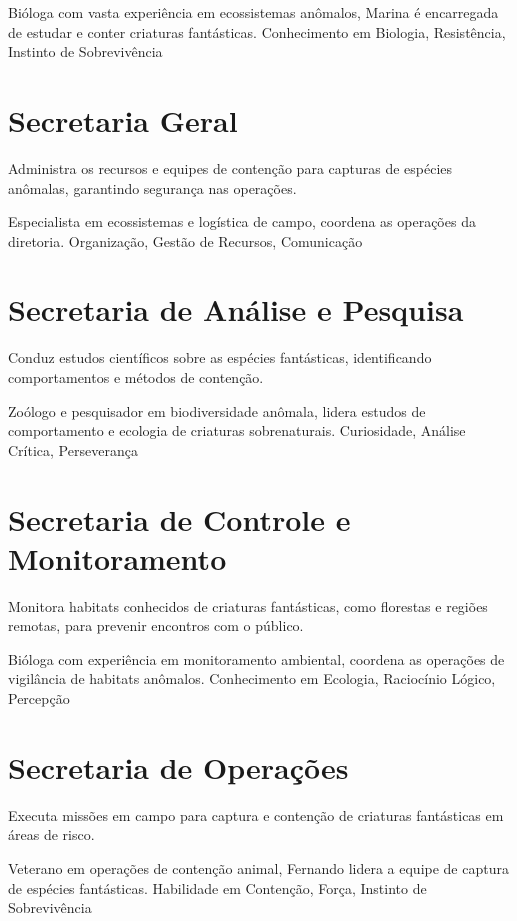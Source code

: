 {Bióloga com vasta experiência em ecossistemas anômalos, Marina é encarregada de estudar e conter criaturas fantásticas.}
{Conhecimento em Biologia, Resistência, Instinto de Sobrevivência}

\section{Secretaria Geral}
Administra os recursos e equipes de contenção para capturas de espécies anômalas, garantindo segurança nas operações.

{Especialista em ecossistemas e logística de campo, coordena as operações da diretoria.}
{Organização, Gestão de Recursos, Comunicação}

\section{Secretaria de Análise e Pesquisa}
Conduz estudos científicos sobre as espécies fantásticas, identificando comportamentos e métodos de contenção.

{Zoólogo e pesquisador em biodiversidade anômala, lidera estudos de comportamento e ecologia de criaturas sobrenaturais.}
{Curiosidade, Análise Crítica, Perseverança}

\section{Secretaria de Controle e Monitoramento}
Monitora habitats conhecidos de criaturas fantásticas, como florestas e regiões remotas, para prevenir encontros com o público.

{Bióloga com experiência em monitoramento ambiental, coordena as operações de vigilância de habitats anômalos.}
{Conhecimento em Ecologia, Raciocínio Lógico, Percepção}

\section{Secretaria de Operações}
Executa missões em campo para captura e contenção de criaturas fantásticas em áreas de risco.

{Veterano em operações de contenção animal, Fernando lidera a equipe de captura de espécies fantásticas.}
{Habilidade em Contenção, Força, Instinto de Sobrevivência}


